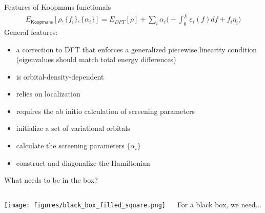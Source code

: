 \documentclass[xcolor=table,aspectratio=169]{beamer}
\numberwithin{equation}{section}
\begin{document}
\begin{frame}{Features of Koopmans functionals}
   \begin{align*}
      E_\mathsf{Koopmans}[\rho,{\{f_i\}}, {\{\alpha_i\}}]
      = {E_{DFT}[\rho]}
      + \sum_i
      {\alpha_i}
      \Biggl(
      -
      {\int^{f_i}_{0} \varepsilon_i(f) df}
      +
      {f_i {\eta_i}}
      \Biggr)
   \end{align*}
   General features:
   \begin{itemize}[<+(1)->]
      \item a correction to DFT that enforces a generalized piecewise linearity condition (eigenvalues should match total energy differences)
      \item is orbital-density-dependent
      \item relies on localization
      \item requires the ab initio calculation of screening parameters
   \end{itemize}

   \begin{itemize}[<+(6)->]
      \item initialize a set of variational orbitals
      \item calculate the screening parameters $\{\alpha_i\}$
      \item construct and diagonalize the Hamiltonian
   \end{itemize}

\end{frame}

\begin{frame}{What needs to be in the box?}

   \begin{columns}
      \begin{column}{0.5\textwidth}
         \texttt{[image: figures/black\_box\_filled\_square.png]}
      \end{column}
      \begin{column}{0.5\textwidth}
         For a black box, we need...

         \vspace{1ex}

         \vspace{1ex}
      \end{column}
   \end{columns}
\end{frame}
\end{document}
